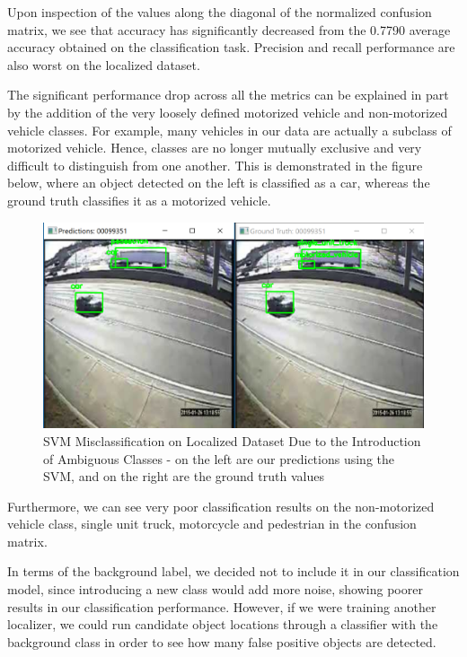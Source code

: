 \documentclass[12pt]{article}
\begin{document}
Upon inspection of the values along the diagonal of the normalized confusion matrix, we see that accuracy has significantly decreased from the 0.7790 average accuracy obtained on the classification task. Precision and recall performance are also worst on the localized dataset.

The significant performance drop across all the metrics can be explained in part by the addition of the very loosely defined motorized vehicle and non-motorized vehicle classes. For example, many vehicles in our data are actually a subclass of motorized vehicle. Hence, classes are no longer mutually exclusive and very difficult to distinguish from one another. This is demonstrated in the figure below, where an object detected on the left is classified as a car, whereas the ground truth classifies it as a motorized vehicle.

\begin{figure}[H]
  \hfill\includegraphics[width=1\textwidth]{noisy_classes.png}\hspace*{\fill}
  \caption{SVM Misclassification on Localized Dataset Due to the Introduction of Ambiguous Classes - on the left are our predictions using the SVM, and on the right are the ground truth values}
\end{figure}

Furthermore, we can see very poor classification results on the non-motorized vehicle class, single unit truck, motorcycle and pedestrian in the confusion matrix. 

In terms of the background label, we decided not to include it in our classification model, since introducing a new class would add more noise, showing poorer results in our classification performance. However, if we were training another localizer, we could run candidate object locations through a classifier with the background class in order to see how many false positive objects are detected.
\end{document}
